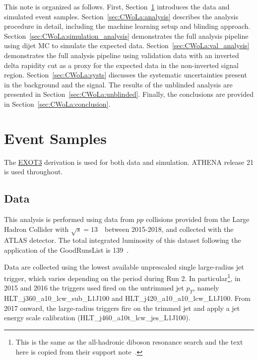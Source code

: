 This note is organized as follows.
First, Section~\ref{sec:CWoLa:eventsamples} introduces the data and simulated event samples.
Section~\ref{sec:CWoLa:analysis} describes the analysis procedure in detail, including the machine learning setup and blinding approach.
Section~\ref{sec:CWoLa:simulation_analysis} demonstrates the full analysis pipeline using dijet MC to simulate the expected data.
Section~\ref{sec:CWoLa:val_analysis} demonstrates the full analysis pipeline using validation data with an inverted delta rapidity cut as a proxy for the expected data in the non-inverted signal region.
Section~\ref{sec:CWoLa:systs} discusses the systematic uncertainties present in the background and the signal.
The results of the unblinded analysis are presented in Section~\ref{sec:CWoLa:unblinded}.
Finally, the conclusions are provided in Section~\ref{sec:CWoLa:conclusion}.

\section{Event Samples}
\label{sec:CWoLa:eventsamples}

The \href{https://gitlab.cern.ch/atlas/athena/blob/master/PhysicsAnalysis/DerivationFramework/DerivationFrameworkExotics/share/EXOT3.py}{EXOT3} derivation is used for both data and simulation.  ATHENA release 21 is used throughout. 

\subsection{Data}
\label{sec:CWoLa:data}

This analysis is performed using data from $pp$ collisions provided from the Large Hadron Collider with $\sqrt{s} = 13$~\TeV~between 2015-2018, and collected with the ATLAS detector. The total integrated luminosity of this dataset following the application of the GoodRunsList is 139~\ifb.

Data are collected using the lowest available unprescaled single large-radius jet trigger, which varies depending on the period during Run 2.  In particular\footnote{This is the same as the all-hadronic diboson resonance search and the text here is copied from their support note~\cite{Aad:2019fbh}.}, in 2015 and 2016 the triggers used fired on the untrimmed jet $p_T$, namely HLT\_j360\_a10\_lcw\_sub\_L1J100 and HLT\_j420\_a10\_a10\_lcw\_L1J100.  From 2017 onward, the large-radius triggers fire on the trimmed jet and apply a jet energy scale calibration (HLT\_j460\_a10t\_lcw\_jes\_L1J100).  

